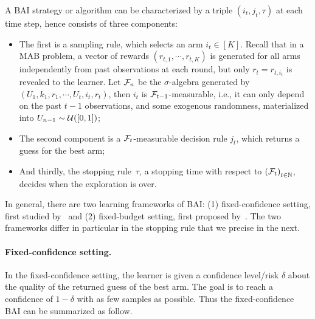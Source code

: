 A BAI strategy or algorithm can be characterized by a triple $(i_t, j_t, \tau)$ at each time step, hence consists of three components: 
\begin{itemize}
    \item The first is a \gls{sampling rule}, which selects an arm $i_t\in[K]$. Recall that in a MAB problem, a vector of rewards $(r_{t,1},\cdots,r_{t,K})$ is generated for all arms independently from past observations at each round, but only $r_t = r_{t,i_t}$ is revealed to the learner. Let $\mathcal{F}_n$ be the $\sigma$-algebra generated by $(U_1,k_1,r_1,\cdots,U_t,i_t,r_t)$, then $i_t$ is $\mathcal{F}_{t-1}$-measurable, i.e., it can only depend on the past $t-1$ observations, and some exogenous randomness, materialized into $U_{n-1} \sim \mathcal{U}([0,1])$;
    \item The second component is a $\mathcal{F}_{t}$-measurable \gls{decision rule} $j_t$, which returns a guess for the best arm;
    \item And thirdly, the \gls{stopping rule}~$\tau$, a stopping time with respect to $\left(\mathcal{F}_{t}\right)_{t \in \mathbb{N}}$, decides when the exploration is over.
\end{itemize}

In general, there are two learning frameworks of BAI: (1) \gls{fixed-confidence setting}, first studied by~\citep{even-dar2003confidence} and (2) \gls{fixed-budget setting}, first proposed by~\citep{audibert2010budget}. The two frameworks differ in particular in the stopping rule that we precise in the next.

\paragraph{Fixed-confidence setting.}

In the fixed-confidence setting, the learner is given a confidence level/risk $\delta$ about the quality of the returned guess of the best arm. The goal is to reach a confidence of $1-\delta$ with as few samples as possible. Thus the fixed-confidence BAI can be summarized as follow.

